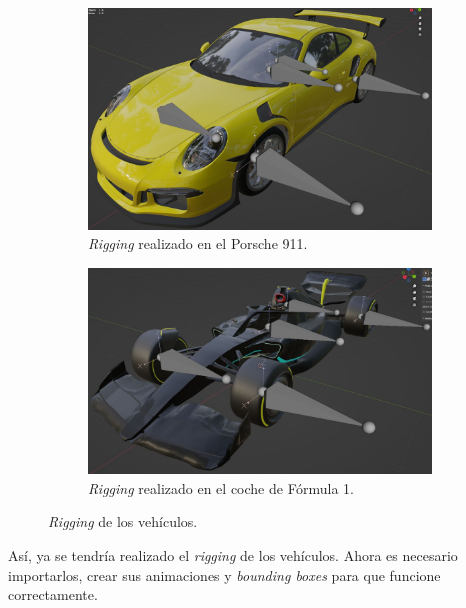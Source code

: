 \begin{figure}[H]
    \centering
\begin{subfigure}[t]{0.48\textwidth}
    \centering
    \includegraphics[width=\textwidth]{imagenes/converted/rigging/911-rigging.jpg}
    \caption{\textit{Rigging} realizado en el Porsche 911.}
    \label{fig:rigging911}
\end{subfigure}
\hfill
\begin{subfigure}[t]{0.48\textwidth}
    \centering
    \includegraphics[width=\textwidth]{imagenes/converted/rigging/f1-rigging.jpg}
    \caption{\textit{Rigging} realizado en el coche de Fórmula 1.}
    \label{fig:riggingf1}
\end{subfigure}
\caption{\textit{Rigging} de los vehículos.}
\end{figure}

Así, ya se tendría realizado el \textit{rigging} de los vehículos. Ahora es necesario importarlos, crear sus animaciones y \textit{bounding boxes} para que funcione correctamente.

